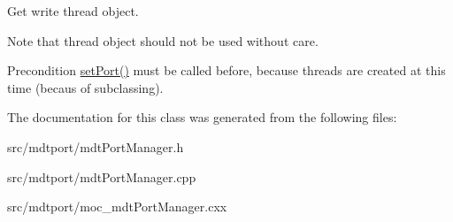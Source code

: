 Get write thread object. 

Note that thread object should not be used without care. \begin{DoxyPrecond}{Precondition}
\hyperlink{classmdt_port_manager_afcd156b2d0c9d340999935efb6cd8cb6}{setPort()} must be called before, because threads are created at this time (becaus of subclassing). 
\end{DoxyPrecond}


The documentation for this class was generated from the following files:\begin{DoxyCompactItemize}
\item 
src/mdtport/mdtPortManager.h\item 
src/mdtport/mdtPortManager.cpp\item 
src/mdtport/moc\_\-mdtPortManager.cxx\end{DoxyCompactItemize}
